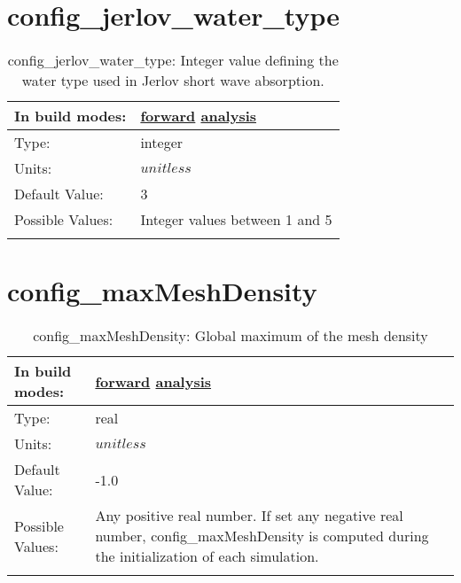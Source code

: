 \section[config\_jerlov\_water\_type]{config\_jerlov\_water\_type}
\label{sec:nm_sec_config_jerlov_water_type}
\begin{center}
\begin{longtable}{| p{2.0in} || p{4.0in} |}
    \hline
    In build modes: & \hyperref[subsec:forward_nm_tab_forcing]{forward} \hyperref[subsec:analysis_nm_tab_forcing]{analysis} \\
    \hline
    Type: & integer \\
    \hline
    Units: & $unitless$ \\
    \hline
    Default Value: & 3 \\
    \hline
    Possible Values: & Integer values between 1 and 5 \\
    \hline
    \caption{config\_jerlov\_water\_type: Integer value defining the water type used in Jerlov short wave absorption.}
\end{longtable}
\end{center}
\section[config\_maxMeshDensity]{config\_maxMeshDensity}
\label{sec:nm_sec_config_maxMeshDensity}
\begin{center}
\begin{longtable}{| p{2.0in} || p{4.0in} |}
    \hline
    In build modes: & \hyperref[subsec:forward_nm_tab_hmix]{forward} \hyperref[subsec:analysis_nm_tab_hmix]{analysis} \\
    \hline
    Type: & real \\
    \hline
    Units: & $unitless$ \\
    \hline
    Default Value: & -1.0 \\
    \hline
    Possible Values: & Any positive real number. If set any negative real number, config\_maxMeshDensity is computed during the initialization of each simulation. \\
    \hline
    \caption{config\_maxMeshDensity: Global maximum of the mesh density}
\end{longtable}
\end{center}
